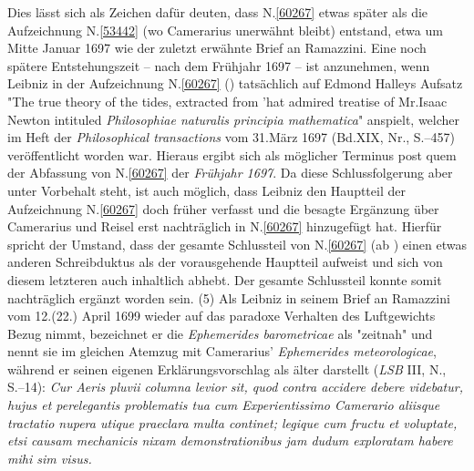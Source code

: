 Dies lässt sich als Zeichen dafür deuten, dass N.\;\ref{60267} etwas später als die Aufzeichnung N.\;\ref{53442} (wo Camerarius unerwähnt bleibt) entstand, etwa um Mitte Januar 1697 wie der zuletzt erwähnte Brief an Ramazzini.
Eine noch spätere Entstehungszeit -- nach dem Frühjahr 1697 -- ist anzunehmen, wenn Leibniz in der Aufzeichnung N.\;\ref{60267} () tatsächlich auf Edmond Halleys Aufsatz "The true theory of the tides, extracted from 'hat admired treatise of Mr.\;Isaac Newton intituled \textit{Philosophiae naturalis principia mathematica}" anspielt, welcher im Heft der \textit{Philosophical transactions} vom 31.\;März 1697 (Bd.\;XIX, Nr., S.--457)\cite{02593}\cite{00158} veröffentlicht worden war.
Hieraus ergibt sich als möglicher Terminus post quem der Abfassung von N.\;\ref{60267} der \textit{Frühjahr 1697}.
Da diese Schlussfolgerung aber unter Vorbehalt steht, %
ist auch möglich, dass Leibniz den Hauptteil der Aufzeichnung N.\;\ref{60267} %
doch früher verfasst und die besagte Ergänzung über Camerarius und Reisel erst nachträglich in N.\;\ref{60267} hinzugefügt hat.
Hierfür spricht %
der Umstand, dass der gesamte Schlussteil von N.\;\ref{60267} (ab ) einen etwas anderen Schreibduktus als der vorausgehende Hauptteil aufweist und sich von diesem letzteren auch inhaltlich abhebt.
Der gesamte Schlussteil konnte somit nachträglich ergänzt worden sein.
\pend%
\pstart%
(5)
Als Leibniz in seinem Brief an Ramazzini vom 12.\;(22.) April 1699 wieder auf das paradoxe Verhalten des Luftgewichts Bezug nimmt, bezeichnet er die \textit{Ephemerides barometricae}\cite{01516}\cite{01517} als "zeitnah" und nennt sie im gleichen Atemzug mit Camerarius' \textit{Ephemerides meteorologicae},\cite{01445} während er seinen eigenen Erklärungsvorschlag als älter darstellt (\textit{LSB} III, N., S.--14):\cite{01447}
\textit{Cur Aeris pluvii columna levior sit, quod contra accidere debere videbatur, hujus et perelegantis problematis tua cum Experientissimo Camerario aliisque tractatio nupera utique praeclara multa continet; legique cum fructu et voluptate, etsi causam mechanicis nixam demonstrationibus jam dudum exploratam habere mihi sim visus.}
